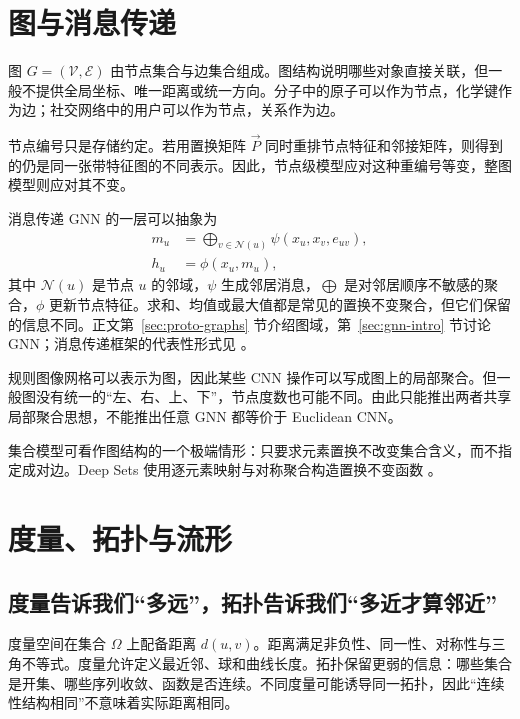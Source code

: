 \section{图与消息传递}
\label{app:primer:graphs}

图 $G=(\mathcal{V},\mathcal{E})$ 由节点集合与边集合组成。图结构说明哪些对象直接关联，但一般不提供全局坐标、唯一距离或统一方向。分子中的原子可以作为节点，化学键作为边；社交网络中的用户可以作为节点，关系作为边。

节点编号只是存储约定。若用置换矩阵 $\vec{P}$ 同时重排节点特征和邻接矩阵，则得到的仍是同一张带特征图的不同表示。因此，节点级模型应对这种重编号等变，整图模型则应对其不变。

消息传递 GNN 的一层可以抽象为
\begin{align}
m_u &= \bigoplus_{v\in\mathcal{N}(u)}
      \psi(x_u,x_v,e_{uv}), \\
h_u &= \phi(x_u,m_u),
\label{app:primer:message-passing}
\end{align}
其中 $\mathcal{N}(u)$ 是节点 $u$ 的邻域，$\psi$ 生成邻居消息，$\bigoplus$ 是对邻居顺序不敏感的聚合，$\phi$ 更新节点特征。求和、均值或最大值都是常见的置换不变聚合，但它们保留的信息不同。正文第~\ref{sec:proto-graphs} 节介绍图域，第~\ref{sec:gnn-intro} 节讨论 GNN；消息传递框架的代表性形式见 \citet{gilmer2017neural}。

\begin{tcolorbox}[width=\linewidth,colback=boxgray!35,colframe=darkgry,title=边界：一般图不是弯曲的图像网格]
规则图像网格可以表示为图，因此某些 CNN 操作可以写成图上的局部聚合。但一般图没有统一的“左、右、上、下”，节点度数也可能不同。由此只能推出两者共享局部聚合思想，不能推出任意 GNN 都等价于 Euclidean CNN。
\end{tcolorbox}

集合模型可看作图结构的一个极端情形：只要求元素置换不改变集合含义，而不指定成对边。Deep Sets 使用逐元素映射与对称聚合构造置换不变函数 \citep{zaheer2017deep}。

\section{度量、拓扑与流形}
\label{app:primer:manifolds}

\subsection{度量告诉我们“多远”，拓扑告诉我们“多近才算邻近”}

度量空间在集合 $\Omega$ 上配备距离 $d(u,v)$。距离满足非负性、同一性、对称性与三角不等式。度量允许定义最近邻、球和曲线长度。拓扑保留更弱的信息：哪些集合是开集、哪些序列收敛、函数是否连续。不同度量可能诱导同一拓扑，因此“连续性结构相同”不意味着实际距离相同。

